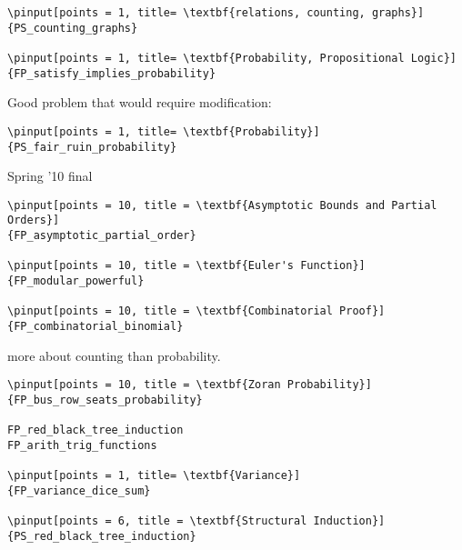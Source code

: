 \documentclass[quiz]{mcs}
\begin{document}
\begin{staffnotes}
\begin{verbatim}
\pinput[points = 1, title= \textbf{relations, counting, graphs}]
{PS_counting_graphs}

\pinput[points = 1, title= \textbf{Probability, Propositional Logic}]
{FP_satisfy_implies_probability}
\end{verbatim}

Good problem that would require modification:
\begin{verbatim}
\pinput[points = 1, title= \textbf{Probability}]
{PS_fair_ruin_probability}
\end{verbatim}

Spring '10 final

\begin{verbatim}
\pinput[points = 10, title = \textbf{Asymptotic Bounds and Partial Orders}]
{FP_asymptotic_partial_order}

\pinput[points = 10, title = \textbf{Euler's Function}]
{FP_modular_powerful}

\pinput[points = 10, title = \textbf{Combinatorial Proof}]
{FP_combinatorial_binomial}
\end{verbatim}

more about counting than probability.
\begin{verbatim}
\pinput[points = 10, title = \textbf{Zoran Probability}]
{FP_bus_row_seats_probability}

FP_red_black_tree_induction
FP_arith_trig_functions

\pinput[points = 1, title= \textbf{Variance}]
{FP_variance_dice_sum}

\pinput[points = 6, title = \textbf{Structural Induction}]
{PS_red_black_tree_induction}
\end{verbatim}

\end{staffnotes}
\end{document}
